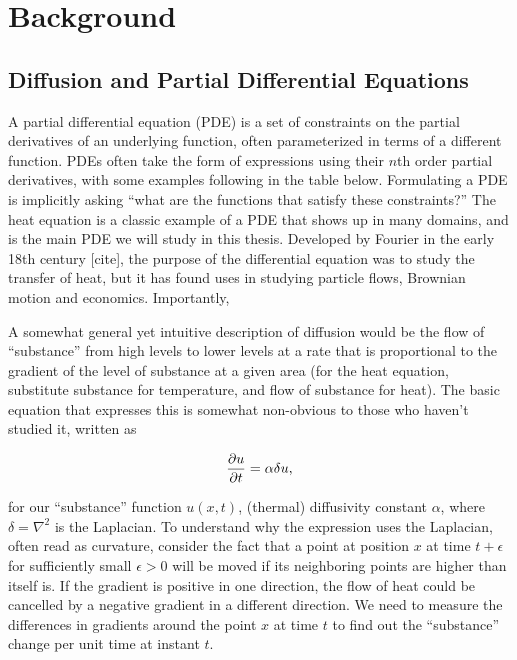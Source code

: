 \documentclass[../main.tex]{subfiles}
\begin{document}
    \chapter{Background}\label{ch:background}

    \section{Diffusion and Partial Differential Equations}\label{sec:diffusion}
    A partial differential equation (PDE) is a set of constraints on the partial derivatives of an underlying function, often parameterized in terms of a different function.
    PDEs often take the form of expressions using their $n$th order partial derivatives, with some examples following in the table below.
    Formulating a PDE is implicitly asking ``what are the functions that satisfy these constraints?''
    The heat equation is a classic example of a PDE that shows up in many domains, and is the main PDE we will study in this thesis.
    Developed by Fourier in the early 18th century [cite], the purpose of the differential equation was to study the transfer of heat, but it has found uses in studying particle flows, Brownian motion and economics.
    Importantly,

    A somewhat general yet intuitive description of diffusion would be the flow of ``substance'' from high levels to lower levels at a rate that is proportional to the gradient of the level of substance at a given area (for the heat equation, substitute substance for temperature, and flow of substance for heat).
    The basic equation that expresses this is somewhat non-obvious to those who haven't studied it, written as

    \begin{equation}
        \frac{\partial u}{\partial t} = \alpha\delta u,\label{eq:basic-heat}
    \end{equation}

    for our ``substance'' function $u(x, t)$, (thermal) diffusivity constant $\alpha$, where $\delta = \nabla^2$ is the Laplacian.
    To understand why the expression uses the Laplacian, often read as curvature, consider the fact that a point at position $x$ at time $t + \epsilon$ for sufficiently small $\epsilon > 0$ will be moved if its
    neighboring points are higher than itself is.
    If the gradient is positive in one direction, the flow of heat could be cancelled by a negative gradient in a different direction.
    We need to measure the differences in gradients around the point $x$ at time $t$ to find out the ``substance'' change per unit time at instant $t$.
\end{document}
